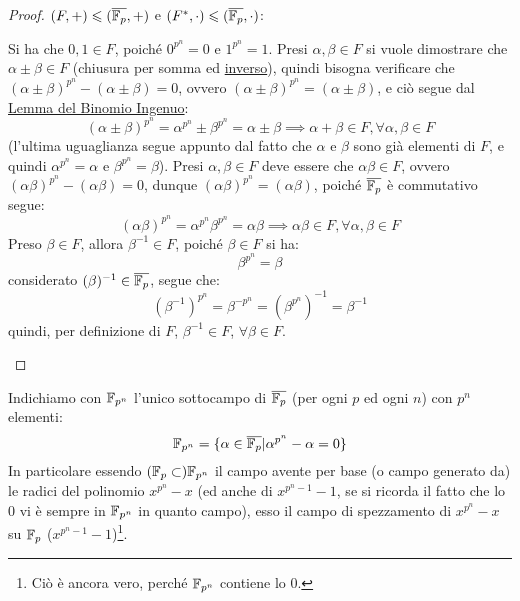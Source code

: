 \documentclass[11pt]{scrartcl}
\begin{document}
\begin{proof}
	 $(F,+) \leqslant (\overline{{\mathbb F}_p},+)$ e $(F^*, \cdot) \leqslant (\overline{{\mathbb F}_p}, \cdot)$:
		\begin{enumerate}[(1)]
			\ii Si ha che $0,1 \in F$, poiché $0^{p^n}=0$ e $1^{p^n} = 1$.
			\ii Presi $\alpha,\beta \in F$ si vuole dimostrare che $\alpha \pm \beta \in F$ (chiusura per somma ed \underline{inverso}), quindi bisogna verificare che
			$(\alpha\pm\beta)^{p^n} - (\alpha\pm\beta) = 0$, ovvero $(\alpha\pm\beta)^{p^n} = (\alpha\pm\beta)$, e ciò segue dal 
			\hyperref[cf:bin]{Lemma del Binomio Ingenuo}:
				\[ (\alpha\pm\beta)^{p^n} =\alpha^{p^n}\pm\beta^{p^n} = \alpha\pm\beta \implies \alpha + \beta \in F, \forall\alpha,\beta \in F 
				\]
			(l'ultima uguaglianza segue appunto dal fatto che $\alpha$ e $\beta$ sono già elementi di $F$, e quindi $\alpha^{p^n} = \alpha$ e $\beta^{p^n} = \beta$).
			\ii Presi $\alpha,\beta \in F$ deve essere che $\alpha\beta\in F$, ovvero $(\alpha\beta)^{p^n} - (\alpha\beta) =0$, dunque 
			$(\alpha\beta)^{p^n} = (\alpha\beta)$, poiché $\overline{{\mathbb F}_p}$ è commutativo segue:
				\[ (\alpha\beta)^{p^n} = \alpha^{p^n}\beta^{p^n} = \alpha\beta \implies \alpha\beta \in F, \forall\alpha,\beta \in F 
					\]
			\ii Preso $\beta \in F$, allora $\beta^{-1} \in  F$, poiché $\beta \in F$ si ha:
				\[ \beta^{p^n} =\beta 
					\]
				considerato $(\beta)^{-1} \in \overline{{\mathbb F}_p}$, segue che:
					\[ (\beta^{-1})^{p^n} = \beta^{-p^n} = (\beta^{p^n})^{-1} = \beta^{-1}
					\]
				quindi, per definizione di $F$, $\beta^{-1} \in F$, $\forall \beta \in F$.
			\end{enumerate}

\end{proof}

\begin{remark}
	Indichiamo con $\mathbb{F}_{p^{n}}$ l'unico sottocampo di $\overline{{\mathbb F}_p}$ (per ogni $p$ ed ogni $n$) con $p^n$ elementi:
		\[ \mathbb{F}_{p^{n}} = \{\alpha \in \overline{{\mathbb F}_p} | \alpha^{p^n}-\alpha = 0\}
			\]
		In particolare essendo $({\mathbb F}_p \subset )\mathbb{F}_{p^{n}}$ il campo avente per base (o campo generato da) le radici del
		 polinomio $x^{p^n}-x$ (ed anche di $x^{p^n-1}-1$, se si ricorda il fatto che lo $0$ vi è sempre in $\mathbb{F}_{p^{n}}$ in quanto campo),
		esso il campo di spezzamento di $x^{p^n}-x$ su ${\mathbb F}_p$ ($x^{p^n-1}-1$)\footnote{Ciò è ancora vero, perché $\mathbb{F}_{p^{n}}$ contiene lo $0$.}.
\end{remark}




\newpage
\end{document}
